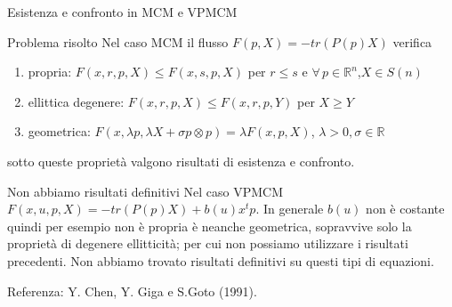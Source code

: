 
\begin{frame}{Esistenza e confronto in MCM e VPMCM}
  \begin{block}{Problema risolto}
    Nel caso MCM il flusso $F(p,X)=-tr(P(p)X)$ verifica
    \begin{enumerate}
    \item \alert{propria}: $F(x,r,p,X)\leq F(x,s,p,X)$ per $r\leq
      s$ e $\forall\,p\in\mathbb{R}^n$,$X\in S(n)$
    \item \alert{ellittica degenere}: $F(x,r,p,X)\leq
      F(x,r,p,Y)$ per $X\geq Y$
    \item \alert{geometrica}: $F(x,\lambda p,\lambda X+\sigma
      p\otimes p)=\lambda F(x,p,X)$, $\lambda >0,\sigma\in\mathbb{R}$
    \end{enumerate}
    sotto queste proprietà valgono risultati di esistenza e confronto.
  \end{block}
  \begin{block}{Non abbiamo risultati definitivi}
    Nel caso VPMCM $F(x,u,p,X)=-tr(P(p)X)+b(u)x^tp$. In generale
    $b(u)$ non è costante quindi per esempio non è
    \alert{propria} è neanche \alert{geometrica}, sopravvive solo la
    proprietà di \alert{degenere ellitticità}; per cui  non possiamo
    utilizzare i risultati precedenti. Non abbiamo trovato risultati
    definitivi su questi tipi di equazioni.
  \end{block}
Referenza: Y. Chen, Y. Giga e S.Goto (1991).
\end{frame}

